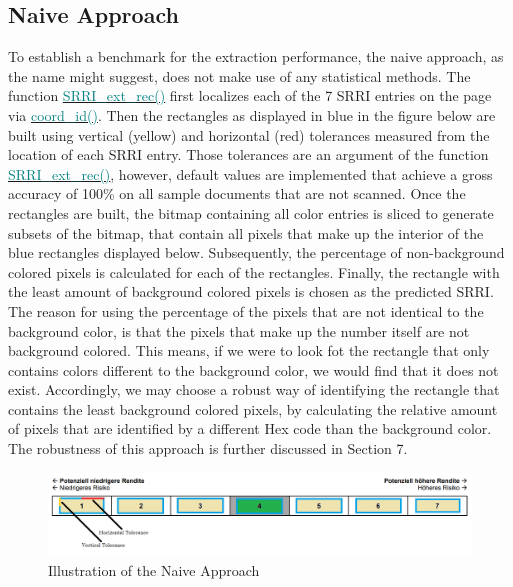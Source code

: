 \documentclass[aodsor,preprint]{imsart}
\numberwithin{equation}{section}
\theoremstyle{plain}
\begin{document}
\subsection{Naive Approach}
To establish a benchmark for the extraction performance, the naive approach, as the name might suggest, does not make use of any statistical methods. The function \href{https://github.com/Base-R-Best-R/KID/blob/main/Code/Package/KIDs/R/SRRI_ext_rec.R}{\textcolor{teal}{SRRI\_ext\_rec()}} first localizes each of the 7 SRRI entries on the page via \href{https://github.com/Base-R-Best-R/KID/blob/main/Code/Package/KIDs/R/coord_id.R}{\textcolor{teal}{coord\_id()}}. Then the rectangles as displayed in blue in the figure below are built using vertical (yellow) and horizontal (red) tolerances measured from the location of each SRRI entry. Those tolerances are an argument of the function \href{https://github.com/Base-R-Best-R/KID/blob/main/Code/Package/KIDs/R/SRRI_ext_rec.R}{\textcolor{teal}{SRRI\_ext\_rec()}}, however, default values are implemented that achieve a gross accuracy of 100\% on all sample documents that are not scanned. Once the rectangles are built, the bitmap containing all color entries is sliced to generate subsets of the bitmap, that contain all pixels that make up the interior of the blue rectangles displayed below. Subsequently, the percentage of non-background colored pixels is calculated for each of the rectangles. Finally, the rectangle with the least amount of background colored pixels is chosen as the predicted SRRI. The reason for using the percentage of the pixels that are not identical to the background color, is that the pixels that make up the number itself are not background colored. This means, if we were to look fot the rectangle that only contains colors different to the background color, we would find that it does not exist. Accordingly, we may choose a robust way of identifying the rectangle that contains the least background colored pixels, by calculating the relative amount of pixels that are identified by a different Hex code than the background color. The robustness of this approach is further discussed in Section 7.

\begin{figure}[H]
	\includegraphics[width = 12cm]{example_SRRI_graph_naive}
	\caption{Illustration of the Naive Approach}
\end{figure}
\newpage
\end{document}
